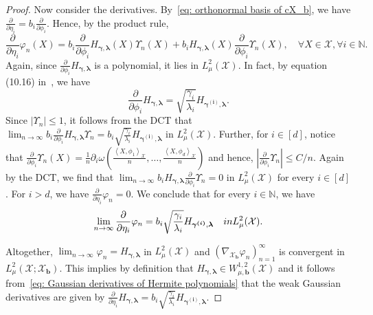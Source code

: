 \documentclass[namedate,webpdf]{ima-authoring-template-blank}
\newcommand{\abs}[1]{\left|#1\right|}
\newcommand{\absd}[1]{|#1|}    %
\newcommand*{\ip}[2]{\left\langle #1, #2 \right\rangle}
\numberwithin{counter}{section}
\numberwithin{equation}{section}
\theoremstyle{plain}
\theoremstyle{definition}
\newcommand*{\cX}{\mathcal{X}}
\newcommand*{\bbN}{\mathbb{N}}
\theoremstyle{thmstyletwo}
\begin{document}
\begin{proof}
    Now consider the derivatives. By~\eqref{eq: orthonormal basis of cX_b}, we have \( \frac{\partial}{\partial \eta_i}  = b_i \frac{\partial}{\partial \phi_i} \). Hence, by the product rule,
    \[
    \frac{\partial}{\partial \eta_i} \varphi_n(X) = 
    b_i \frac{\partial}{\partial \phi_i} H_{\bm{\gamma}, \bm{\lambda}}(X) \Upsilon_n(X) + b_i H_{\bm{\gamma}, \bm{\lambda}}(X) \frac{\partial}{\partial \phi_i} \Upsilon_n(X), \quad \forall X \in \cX, \forall i \in \bbN.
    \]
    Again, since \( \frac{\partial}{\partial \phi_i} H_{\bm{\gamma}, \bm{\lambda}} \) is a polynomial, it lies in \( L^2_{\mu}(\cX) \). In fact, by equation (10.16) in~\cite{daprato_IntroductionInfiniteDimensionalAnalysis_2006}, we have
    \[
    \frac{\partial}{\partial \phi_i} H_{\bm{\gamma}, \bm{\lambda}} = \sqrt{\frac{\gamma_i}{\lambda_i}} H_{\bm{\gamma^{(i)}}, \bm{\lambda}}.
    \]
    Since \( \abs{\Upsilon_n} \leq 1 \), it follows from the DCT that \( \lim_{n \to \infty} b_i \frac{\partial}{\partial \phi_i} H_{\bm{\gamma}, \bm{\lambda}} \Upsilon_n = b_i \sqrt{\frac{\gamma_i}{\lambda_i}} H_{\bm{\gamma^{(i)}}, \bm{\lambda}} \) in \( L^2_{\mu}(\cX) \).
    Further, for \( i \in [d] \), notice that \( \frac{\partial}{\partial \phi_i} \Upsilon_n(X) = \frac{1}{n} \partial_i \omega \left( \frac{\ip{X}{\phi_1}_{\cX}}{n}, \dots, \frac{\ip{X}{\phi_d}_{\cX}}{n} \right) \) and hence, \( \absd{\frac{\partial}{\partial \phi_i} \Upsilon_n} \leq C / n \). Again by the DCT, we find that \( \lim_{n \to \infty} b_i H_{\bm{\gamma}, \bm{\lambda}} \frac{\partial}{\partial \phi_i} \Upsilon_n = 0 \) in \( L^2_{\mu}(\cX) \) for every \( i \in [d] \).
    For \(i > d \), we have \( \frac{\partial}{\partial \eta_i} \varphi_n = 0 \). We conclude that for every \( i \in \bbN \), we have
    \begin{equation}
    \label{eq: Gaussian derivatives of Hermite polynomials}
        \lim_{n \to \infty} \frac{\partial}{\partial \eta_i} \varphi_n = b_i \sqrt{\frac{\gamma_i}{\lambda_i}} H_{\bm{\gamma^{(i)}}, \bm{\lambda}} \quad \textup{ in } L^2_{\mu}(\cX).
    \end{equation}
    
    Altogether, \( \lim_{n \to \infty} \varphi_n =  H_{\bm{\gamma}, \bm{\lambda}} \) in \( L^2_{\mu}(\cX) \) and \( (\nabla_{\cX_{\bm{b}}} \varphi_n)_{n = 1}^{\infty} \) is convergent in \( L^2_{\mu}(\cX; \cX_{\bm{b}}) \). This implies by definition that \( H_{\bm{\gamma}, \bm{\lambda}} \in W^{1,2}_{\mu, \bm{b}}(\cX) \) and it follows from~\eqref{eq: Gaussian derivatives of Hermite polynomials} that the weak Gaussian derivatives are given by \( \frac{\partial}{\partial \eta_i} H_{\bm{\gamma}, \bm{\lambda}} = b_i \sqrt{\frac{\gamma_i}{\lambda_i}} H_{\bm{\gamma^{(i)}}, \bm{\lambda}} \).
\end{proof}
\end{document}

